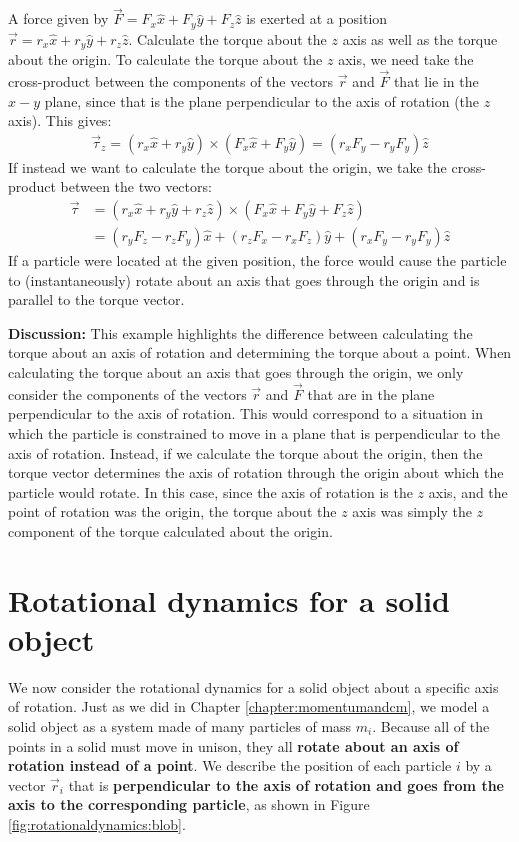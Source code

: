 \begin{example}{A force given by $\vec F=F_x\hat x + F_y \hat y + F_z \hat z$ is exerted at a position $\vec r=r_x \hat x + r_y \hat y + r_z\hat z$. Calculate the torque about the $z$ axis as well as the torque about the origin.}
To calculate the torque about the $z$ axis, we need take the cross-product between the components of the vectors $\vec r$ and $\vec F$ that lie in the $x-y$ plane, since that is the plane perpendicular to the axis of rotation (the $z$ axis). This gives:
\begin{align*}
\vec\tau_z =(r_x \hat x + r_y \hat y) \times (F_x\hat x + F_y \hat y) =(r_xF_y-r_yF_y)\hat z
\end{align*}
If instead we want to calculate the torque about the origin, we take the cross-product between the two vectors:
\begin{align*}
\vec\tau &=(r_x \hat x + r_y \hat y+ r_z\hat z) \times (F_x\hat x + F_y \hat y+ F_z \hat z)\\
&=(r_yF_z-r_zF_y)\hat x+(r_zF_x-r_xF_z)\hat y+(r_xF_y-r_yF_y)\hat z
\end{align*}
If a particle were located at the given position, the force would cause the particle to (instantaneously) rotate about an axis that goes through the origin and is parallel to the torque vector. 

\textbf{Discussion:} This example highlights the difference between calculating the torque about an axis of rotation and determining the torque about a point. When calculating the torque about an axis that goes through the origin, we only consider the components of the vectors $\vec r$ and $\vec F$ that are in the plane perpendicular to the axis of rotation. This would correspond to a situation in which the particle is constrained to move in a plane that is perpendicular to the axis of rotation. Instead, if we calculate the torque about the origin, then the torque vector determines the axis of rotation through the origin about which the particle would rotate. In this case, since the axis of rotation is the $z$ axis, and the point of rotation was the origin, the torque about the $z$ axis was simply the $z$ component of the torque calculated about the origin.
\end{example}


\section{Rotational dynamics for a solid object}
We now consider the rotational dynamics for a solid object about a specific axis of rotation. Just as we did in Chapter \ref{chapter:momentumandcm}, we model a solid object as a system made of many particles of mass $m_i$. Because all of the points in a solid must move in unison, they all \textbf{rotate about an axis of rotation instead of a point}. We describe the position of each particle $i$ by a vector $\vec r_i$ that is \textbf{perpendicular to the axis of rotation and goes from the axis to the corresponding particle}, as shown in Figure \ref{fig:rotationaldynamics:blob}.

